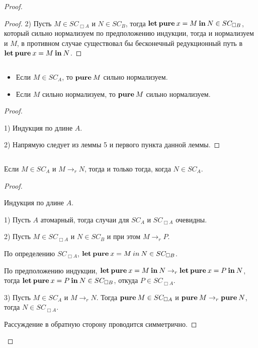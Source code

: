 \begin{proof}
\begin{proof}
2) Пусть $M \in SC_{\Box A}$ и $N \in SC_B$, тогда ${\bf let \: pure \:} x = M {\: \bf in \:} N \in SC_{\Box B}$, который сильно нормализуем по
предположению индукции, тогда и нормализуем и $M$, в противном случае существовал бы бесконечный редукционный путь в
${\bf let \: pure \:} x = M {\: \bf in \:} N$.
\end{proof}

\begin{lemma}
$ $

  \begin{itemize}
    \item Если $M \in SC_A$, то ${\bf pure \:} M$ сильно нормализуем.
    \item Если $M$ сильно нормализуем, то ${\bf pure \:} M$ сильно нормализуем.
  \end{itemize}
\end{lemma}

\begin{proof}
$ $

  1) Индукция по длине $A$.

  2) Напрямую следует из леммы 5 и первого пункта данной леммы.
\end{proof}

\begin{lemma}
$ $

  Если $M \in SC_A$ и $M \rightarrow_{r} N$, тогда и только тогда, когда $N \in SC_A$.

\end{lemma}

\begin{proof}
$ $

  Индукция по длине $A$.

1) Пусть $A$ атомарный, тогда случаи для $SC_A$ и $SC_{\Box A}$ очевидны.

2) Пусть $M \in SC_{\Box A}$ и $N \in SC_B$ и при этом $M \rightarrow_{r} P$.

По определению $SC_{\Box A}$, ${\bf let \: pure \:} x = M {\: in \:} N \in SC_{\Box B}$.

По предположению индукции, ${\bf let \: pure \:} x = M {\: \bf in \:} N \rightarrow_{r}
{\bf let \: pure \:} x = P {\: \bf in \:} N$, тогда ${\bf let \: pure \:} x = P {\: \bf in \:} N \in SC_{\Box B}$,
откуда $P \in SC_{\Box A}$.

3) Пусть $M \in SC_A$ и $M \rightarrow_{r} N$. Тогда ${\bf pure \:} M \in SC_{\Box A}$ и
${\bf pure \:} M \rightarrow_{r} {\bf pure \:} N$, тогда $N \in SC_{\Box A}$.

Рассуждение в обратную сторону проводится симметрично.


\end{proof}
\end{proof}

